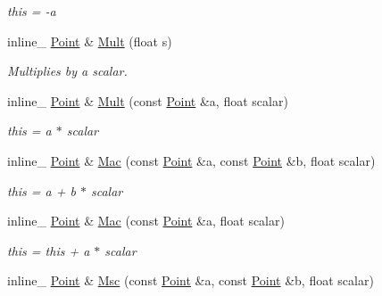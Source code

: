 \begin{DoxyCompactItemize}
\begin{DoxyCompactList}\small\item\em this = -\/a \end{DoxyCompactList}\item 
inline\+\_\+ \hyperlink{classPoint}{Point} \& \hyperlink{classPoint_a5e0e11455fc386e3243932bebee1b0a5}{Mult} (float s)\hypertarget{classPoint_a5e0e11455fc386e3243932bebee1b0a5}{}\label{classPoint_a5e0e11455fc386e3243932bebee1b0a5}

\begin{DoxyCompactList}\small\item\em Multiplies by a scalar. \end{DoxyCompactList}\item 
inline\+\_\+ \hyperlink{classPoint}{Point} \& \hyperlink{classPoint_a00050920c3249f183de3b16d8fb6868b}{Mult} (const \hyperlink{classPoint}{Point} \&a, float scalar)\hypertarget{classPoint_a00050920c3249f183de3b16d8fb6868b}{}\label{classPoint_a00050920c3249f183de3b16d8fb6868b}

\begin{DoxyCompactList}\small\item\em this = a $\ast$ scalar \end{DoxyCompactList}\item 
inline\+\_\+ \hyperlink{classPoint}{Point} \& \hyperlink{classPoint_aa7487bbb1b8865004be202b1d6e1dbe5}{Mac} (const \hyperlink{classPoint}{Point} \&a, const \hyperlink{classPoint}{Point} \&b, float scalar)\hypertarget{classPoint_aa7487bbb1b8865004be202b1d6e1dbe5}{}\label{classPoint_aa7487bbb1b8865004be202b1d6e1dbe5}

\begin{DoxyCompactList}\small\item\em this = a + b $\ast$ scalar \end{DoxyCompactList}\item 
inline\+\_\+ \hyperlink{classPoint}{Point} \& \hyperlink{classPoint_ae3e119e45894e04d9424ae3bcf250102}{Mac} (const \hyperlink{classPoint}{Point} \&a, float scalar)\hypertarget{classPoint_ae3e119e45894e04d9424ae3bcf250102}{}\label{classPoint_ae3e119e45894e04d9424ae3bcf250102}

\begin{DoxyCompactList}\small\item\em this = this + a $\ast$ scalar \end{DoxyCompactList}\item 
inline\+\_\+ \hyperlink{classPoint}{Point} \& \hyperlink{classPoint_a158adf82aa3957050f2cc51b8dd84cf2}{Msc} (const \hyperlink{classPoint}{Point} \&a, const \hyperlink{classPoint}{Point} \&b, float scalar)\hypertarget{classPoint_a158adf82aa3957050f2cc51b8dd84cf2}{}\label{classPoint_a158adf82aa3957050f2cc51b8dd84cf2}


\end{DoxyCompactItemize}
